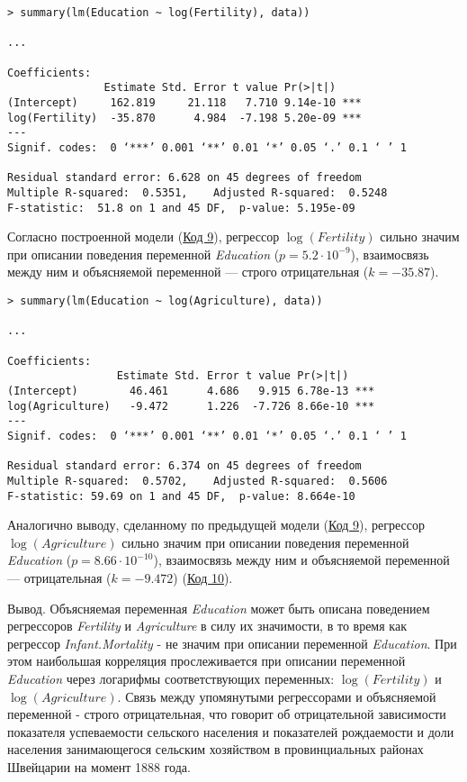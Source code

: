 \begin{code}
\begin{verbatim}
> summary(lm(Education ~ log(Fertility), data))

...

Coefficients:
               Estimate Std. Error t value Pr(>|t|)    
(Intercept)     162.819     21.118   7.710 9.14e-10 ***
log(Fertility)  -35.870      4.984  -7.198 5.20e-09 ***
---
Signif. codes:  0 ‘***’ 0.001 ‘**’ 0.01 ‘*’ 0.05 ‘.’ 0.1 ‘ ’ 1

Residual standard error: 6.628 on 45 degrees of freedom
Multiple R-squared:  0.5351,    Adjusted R-squared:  0.5248 
F-statistic:  51.8 on 1 and 45 DF,  p-value: 5.195e-09
\end{verbatim}
\label{code:9}
\end{code}

Согласно построенной модели (\hyperref[code:9]{Код 9}), регрессор $\log(\textit{Fertility})$ сильно значим при описании поведения переменной \textit{Education} ($p = 5.2\cdot 10^{-9}$), взаимосвязь между ним и объясняемой переменной --- строго отрицательная ($k = -35.87$).

\begin{code}
\begin{verbatim}
> summary(lm(Education ~ log(Agriculture), data))

...

Coefficients:
                 Estimate Std. Error t value Pr(>|t|)    
(Intercept)        46.461      4.686   9.915 6.78e-13 ***
log(Agriculture)   -9.472      1.226  -7.726 8.66e-10 ***
---
Signif. codes:  0 ‘***’ 0.001 ‘**’ 0.01 ‘*’ 0.05 ‘.’ 0.1 ‘ ’ 1

Residual standard error: 6.374 on 45 degrees of freedom
Multiple R-squared:  0.5702,    Adjusted R-squared:  0.5606 
F-statistic: 59.69 on 1 and 45 DF,  p-value: 8.664e-10
\end{verbatim}
\label{code:10}
\end{code}

Аналогично выводу, сделанному по предыдущей модели (\hyperref[code:9]{Код 9}), регрессор $\log(\textit{Agriculture})$ сильно значим при описании поведения переменной \textit{Education} ($p = 8.66\cdot 10^{-10}$), взаимосвязь между ним и объясняемой переменной --- отрицательная ($k = -9.472$) (\hyperref[code:10]{Код 10}).

Вывод. Объясняемая переменная \textit{Education} может быть описана поведением регрессоров \textit{Fertility} и \textit{Agriculture} в силу их значимости, в то время как регрессор \textit{Infant.Mortality} - не значим при описании переменной \textit{Education}. При этом наибольшая корреляция прослеживается при описании переменной \textit{Education} через логарифмы соответствующих переменных: $\log(\textit{Fertility})$ и $\log(\textit{Agriculture})$. Связь между упомянутыми регрессорами и объясняемой переменной - строго отрицательная, что говорит об отрицательной зависимости показателя успеваемости сельского населения и показателей рождаемости и доли населения занимающегося сельским хозяйством в провинциальных районах Швейцарии на момент 1888 года.


